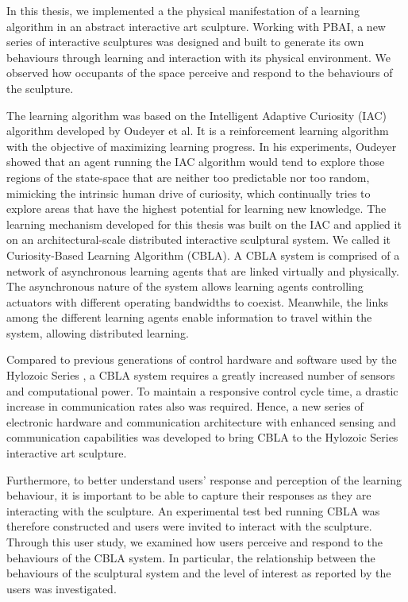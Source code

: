 In this thesis, we implemented a the physical manifestation of a learning algorithm in an abstract interactive art sculpture. Working with PBAI, a new series of interactive sculptures was designed and built to generate its own behaviours through learning and interaction with its physical environment. We observed how occupants of the space perceive and respond to the behaviours of the sculpture. 

The learning algorithm was based on the Intelligent Adaptive Curiosity \cite{Oudeyer2007} (IAC) algorithm developed by Oudeyer et al. It is a reinforcement learning algorithm with the objective of maximizing learning progress. In his experiments, Oudeyer showed that an agent running the IAC algorithm would tend to explore those regions of the state-space that are neither too predictable nor too random, mimicking the intrinsic human drive of curiosity, which continually tries to explore areas that have the highest potential for learning new knowledge. The learning mechanism developed for this thesis was built on the IAC and applied it on an architectural-scale distributed interactive sculptural system. We called it Curiosity-Based Learning Algorithm (CBLA). A CBLA system is comprised of a network of asynchronous learning agents that are linked virtually and physically. The asynchronous nature of the system allows learning agents controlling actuators with different operating bandwidths to coexist. Meanwhile, the links among the different learning agents enable information to travel within the system, allowing distributed learning.

Compared to previous generations of control hardware and software used by the Hylozoic Series \cite{Beesley2010-1}, a CBLA system requires a greatly increased number of sensors and computational power. To maintain a responsive control cycle time, a drastic increase in communication rates also was required. Hence, a new series of electronic hardware and communication architecture with enhanced sensing and communication capabilities was developed to bring CBLA to the Hylozoic Series interactive art sculpture. 

Furthermore, to better understand users' response and perception of the learning behaviour, it is important to be able to capture their responses as they are interacting with the sculpture. An experimental test bed running CBLA was therefore constructed and users were invited to interact with the sculpture. Through this user study, we examined how users perceive and respond to the behaviours of the CBLA system. In particular, the relationship between the behaviours of the sculptural system and the level of interest as reported by the users was investigated. 

